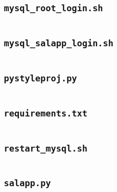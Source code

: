 \subsection{\texttt{mysql\_root\_login.sh}}
\begin{codelisting}
\label{fcl:uswacs-2-iy2d502-salapp:mysql_root_login.sh}
\inputminted[breakanywhere]{bash}{../uswacs-2-iy2d502-salapp/mysql_root_login.sh}\end{codelisting}
\subsection{\texttt{mysql\_salapp\_login.sh}}
\begin{codelisting}
\label{fcl:uswacs-2-iy2d502-salapp:mysql_salapp_login.sh}
\inputminted[breakanywhere]{bash}{../uswacs-2-iy2d502-salapp/mysql_salapp_login.sh}\end{codelisting}
\subsection{\texttt{pystyleproj.py}}
\begin{codelisting}
\label{fcl:uswacs-2-iy2d502-salapp:pystyleproj.py}
\inputminted[breakanywhere]{python3}{../uswacs-2-iy2d502-salapp/pystyleproj.py}\end{codelisting}
\subsection{\texttt{requirements.txt}}
\begin{codelisting}
\label{fcl:uswacs-2-iy2d502-salapp:requirements.txt}
\inputminted[breakanywhere]{text}{../uswacs-2-iy2d502-salapp/requirements.txt}\end{codelisting}
\subsection{\texttt{restart\_mysql.sh}}
\begin{codelisting}
\label{fcl:uswacs-2-iy2d502-salapp:restart_mysql.sh}
\inputminted[breakanywhere]{bash}{../uswacs-2-iy2d502-salapp/restart_mysql.sh}\end{codelisting}
\subsection{\texttt{salapp.py}}
\begin{codelisting}
\label{fcl:uswacs-2-iy2d502-salapp:salapp.py}
\inputminted[breakanywhere]{python3}{../uswacs-2-iy2d502-salapp/salapp.py}\end{codelisting}
